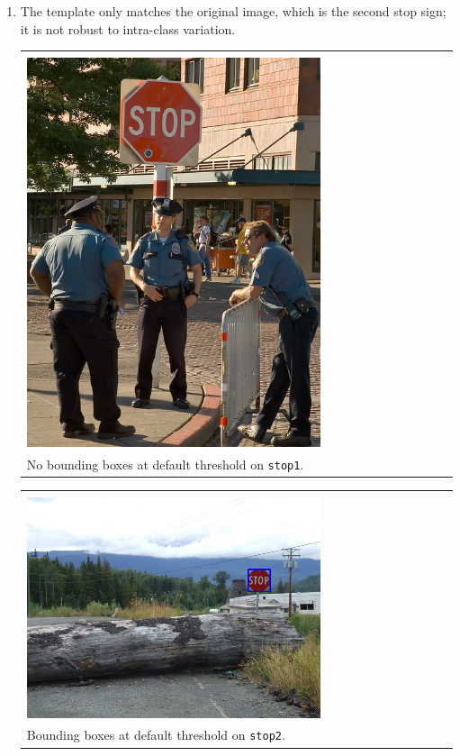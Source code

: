 \documentclass{article}
\begin{document}
\begin{enumerate}[label=(\roman*)]
\item %
The template only matches the original image, which is the second stop sign; it is not robust to intra-class variation.

\begin{tabular}[t]{l}
	\hline \\
	\includegraphics[width=0.7\textwidth]{img/stop1_detection.png} \\
	No bounding boxes at default threshold on \texttt{stop1}. \\
	\hline
\end{tabular}

\begin{tabular}[t]{l}
	\hline \\
	\includegraphics[width=0.7\textwidth]{img/stop2_detection.png} \\
	Bounding boxes at default threshold on \texttt{stop2}. \\
	\hline
\end{tabular}


\end{enumerate}
\end{document}
